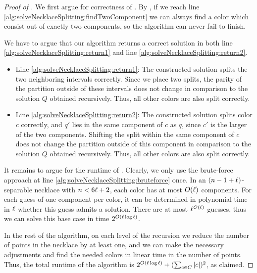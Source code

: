 \documentclass[a4paper,UKenglish,cleveref, thm-restate]{lipics-v2021}
\begin{document}
\begin{proof}[Proof of ]
We first argue for correctness of . 
By , if we reach line \ref{alg:solveNecklaceSplitting:findTwoComponent} we can always find a color which consist out of exactly two components, so the algorithm can never fail to finish.

We have to argue that our algorithm returns a correct solution in both line \ref{alg:solveNecklaceSplitting:return1} and line \ref{alg:solveNecklaceSplitting:return2}.
\begin{itemize}
\item[(i)] Line \ref{alg:solveNecklaceSplitting:return1}: The constructed solution splits the two neighboring intervals correctly. Since we place two splits, the parity of the partition outside of these intervals does not change in comparison to the solution $Q$ obtained recursively. Thus, all other colors are also split correctly.

\item[(ii)] Line \ref{alg:solveNecklaceSplitting:return2}: The constructed solution splits color $c$ correctly, and $q'$ lies in the same component of $c$ as $q$, since $c'$ is the larger of the two components. Shifting the split within the same component of $c$ does not change the partition outside of this component in comparison to the solution $Q$ obtained recursively. Thus, all other colors are also split correctly.
\end{itemize}

It remains to argue for the runtime of . Clearly, we only use the brute-force approach at line \ref{alg:solveNecklaceSplitting:bruteforce} once. In an $(\dimension-1+\constB)$-separable necklace with $\dimension<6\constB+2$, each color has at most $O(\constB)$ components. For each guess of one component per color, it can be determined in polynomial time in $\constB$ whether this guess admits a solution. There are at most $\constB^{O(\constB)}$ guesses, thus we can solve this base case in time $2^{O(\constB\log\constB)}$.

In the rest of the algorithm, on each level of the recursion we reduce the number of points in the necklace by at least one, and we can make the necessary adjustments and find the needed colors in linear time in the number of points. Thus, the total runtime of the algorithm is $2^{O(\constB\log\constB)}+(\sum_{c\in\Colors}|c|)^2$, as claimed.
\end{proof}
\end{document}
